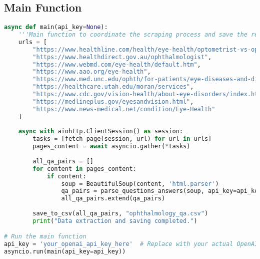 \documentclass[a4paper,12pt]{article}
\begin{document}
\subsection{Main Function}
\begin{lstlisting}[language=Python, caption={Main Function}]
async def main(api_key=None):
    '''Main function to coordinate the scraping process and save the results.'''
    urls = [
        "https://www.healthline.com/health/eye-health/optometrist-vs-ophthalmologist",
        "https://www.healthdirect.gov.au/ophthalmologist",
        "https://www.webmd.com/eye-health/default.htm",
        "https://www.aao.org/eye-health",
        "https://www.med.unc.edu/ophth/for-patients/eye-diseases-and-disorders/",
        "https://healthcare.utah.edu/moran/services",
        "https://www.cdc.gov/vision-health/about-eye-disorders/index.html",
        "https://medlineplus.gov/eyesandvision.html",
        "https://www.news-medical.net/condition/Eye-Health"
    ]
    
    async with aiohttp.ClientSession() as session:
        tasks = [fetch_page(session, url) for url in urls]
        pages_content = await asyncio.gather(*tasks)
        
        all_qa_pairs = []
        for content in pages_content:
            if content:
                soup = BeautifulSoup(content, 'html.parser')
                qa_pairs = parse_questions_answers(soup, api_key=api_key)
                all_qa_pairs.extend(qa_pairs)
        
        save_to_csv(all_qa_pairs, "ophthalmology_qa.csv")
        print("Data extraction and saving completed.")

# Run the main function
api_key = 'your_openai_api_key_here'  # Replace with your actual OpenAI API key if available
asyncio.run(main(api_key=api_key))
\end{lstlisting}
\end{document}
